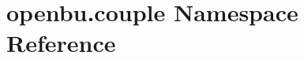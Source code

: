 \hypertarget{namespaceopenbu_1_1couple}{}\section{openbu.\+couple Namespace Reference}
\label{namespaceopenbu_1_1couple}
